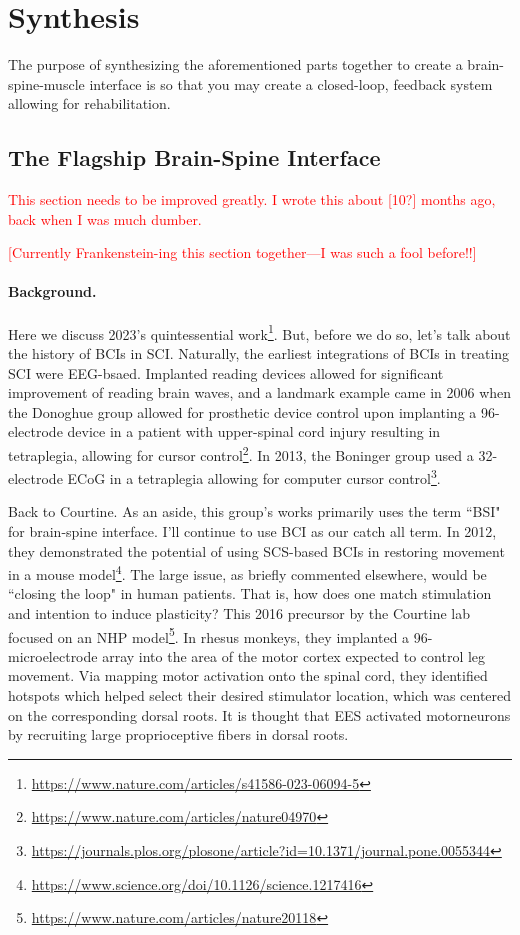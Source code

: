 
\chapter{Synthesis}

The purpose of synthesizing the aforementioned parts together to create a brain-spine-muscle interface is so that you may create a closed-loop, feedback system allowing for rehabilitation. 


\section{The Flagship Brain-Spine Interface} 
\textcolor{red}{This section needs to be improved greatly. I wrote this about [10?] months ago, back when I was much dumber.}\newline

\textcolor{red}{[Currently Frankenstein-ing this section together---I was such a fool before!!]}

\subsubsection{Background.} 

Here we discuss 2023's quintessential work\footnote{\url{https://www.nature.com/articles/s41586-023-06094-5}}. But, before we do so, let's talk about the history of BCIs in SCI. Naturally, the earliest integrations of BCIs in treating SCI were EEG-bsaed. Implanted reading devices allowed for significant improvement of reading brain waves, and a landmark example came in 2006 when the Donoghue group allowed for prosthetic device control upon implanting a 96-electrode device in a patient with upper-spinal cord injury resulting in tetraplegia, allowing for cursor control\footnote{\url{https://www.nature.com/articles/nature04970}}. In 2013, the Boninger group used a 32-electrode ECoG in a tetraplegia allowing for computer cursor control\footnote{\url{https://journals.plos.org/plosone/article?id=10.1371/journal.pone.0055344}}.\newline


Back to Courtine. As an aside, this group's works primarily uses the term ``BSI" for brain-spine interface. I'll continue to use BCI as our catch all term. In 2012, they demonstrated the potential of using SCS-based BCIs in restoring movement in a mouse model\footnote{\url{https://www.science.org/doi/10.1126/science.1217416}}. The large issue, as briefly commented elsewhere, would be ``closing the loop" in human patients. That is, how does one match stimulation and intention to induce plasticity? This 2016 precursor by the Courtine lab focused on an NHP model\footnote{\url{https://www.nature.com/articles/nature20118}}. In rhesus monkeys, they implanted a 96-microelectrode array into the area of the motor cortex expected to control leg movement. Via mapping motor activation onto the spinal cord, they identified hotspots which helped select their desired stimulator location, which  was centered on the corresponding dorsal roots. It is thought that EES activated motorneurons by recruiting large proprioceptive fibers in dorsal roots.\newline

